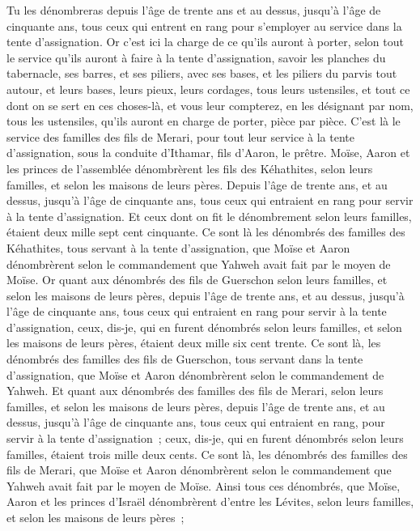 \begin{multicols}{2}
Tu les dénombreras depuis l'âge de trente ans et au dessus, jusqu'à l'âge de cinquante ans, tous ceux qui entrent en rang pour s'employer au service dans la tente d'assignation.
Or c'est ici la charge de ce qu'ils auront à porter, selon tout le service qu'ils auront à faire à la tente d'assignation, savoir les planches du tabernacle, ses barres, et ses piliers, avec ses bases,
et les piliers du parvis tout autour, et leurs bases, leurs pieux, leurs cordages, tous leurs ustensiles, et tout ce dont on se sert en ces choses-là, et vous leur compterez, en les désignant par nom, tous les ustensiles, qu'ils auront en charge de porter, pièce par pièce.
C'est là le service des familles des fils de Merari, pour tout leur service à la tente d'assignation, sous la conduite d'Ithamar, fils d'Aaron, le prêtre.
Moïse, Aaron et les princes de l'assemblée dénombrèrent les fils des Kéhathites, selon leurs familles, et selon les maisons de leurs pères.
Depuis l'âge de trente ans, et au dessus, jusqu'à l'âge de cinquante ans, tous ceux qui entraient en rang pour servir à la tente d'assignation.
Et ceux dont on fit le dénombrement selon leurs familles, étaient deux mille sept cent cinquante.
Ce sont là les dénombrés des familles des Kéhathites, tous servant à la tente d'assignation, que Moïse et Aaron dénombrèrent selon le commandement que Yahweh avait fait par le moyen de Moïse.
Or quant aux dénombrés des fils de Guerschon selon leurs familles, et selon les maisons de leurs pères,
depuis l'âge de trente ans, et au dessus, jusqu'à l'âge de cinquante ans, tous ceux qui entraient en rang pour servir à la tente d'assignation,
ceux, dis-je, qui en furent dénombrés selon leurs familles, et selon les maisons de leurs pères, étaient deux mille six cent trente.
Ce sont là, les dénombrés des familles des fils de Guerschon, tous servant dans la tente d'assignation, que Moïse et Aaron dénombrèrent selon le commandement de Yahweh.
Et quant aux dénombrés des familles des fils de Merari, selon leurs familles, et selon les maisons de leurs pères,
depuis l'âge de trente ans, et au dessus, jusqu'à l'âge de cinquante ans, tous ceux qui entraient en rang, pour servir à la tente d'assignation~;
ceux, dis-je, qui en furent dénombrés selon leurs familles, étaient trois mille deux cents.
Ce sont là, les dénombrés des familles des fils de Merari, que Moïse et Aaron dénombrèrent selon le commandement que Yahweh avait fait par le moyen de Moïse.
Ainsi tous ces dénombrés, que Moïse, Aaron et les princes d'Israël dénombrèrent d'entre les Lévites, selon leurs familles, et selon les maisons de leurs pères~;

\end{multicols}
